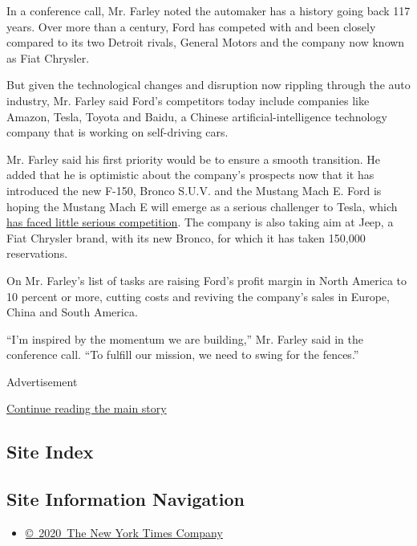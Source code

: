 In a conference call, Mr. Farley noted the automaker has a history going
back 117 years. Over more than a century, Ford has competed with and
been closely compared to its two Detroit rivals, General Motors and the
company now known as Fiat Chrysler.

But given the technological changes and disruption now rippling through
the auto industry, Mr. Farley said Ford's competitors today include
companies like Amazon, Tesla, Toyota and Baidu, a Chinese
artificial-intelligence technology company that is working on
self-driving cars.

Mr. Farley said his first priority would be to ensure a smooth
transition. He added that he is optimistic about the company's prospects
now that it has introduced the new F-150, Bronco S.U.V. and the Mustang
Mach E. Ford is hoping the Mustang Mach E will emerge as a serious
challenger to Tesla, which
\href{https://www.nytimes3xbfgragh.onion/2020/07/22/business/tesla-electric-car-audi-polestar.html}{has
faced little serious competition}. The company is also taking aim at
Jeep, a Fiat Chrysler brand, with its new Bronco, for which it has taken
150,000 reservations.

On Mr. Farley's list of tasks are raising Ford's profit margin in North
America to 10 percent or more, cutting costs and reviving the company's
sales in Europe, China and South America.

``I'm inspired by the momentum we are building,'' Mr. Farley said in the
conference call. ``To fulfill our mission, we need to swing for the
fences.''

Advertisement

\protect\hyperlink{after-bottom}{Continue reading the main story}

\hypertarget{site-index}{%
\subsection{Site Index}\label{site-index}}

\hypertarget{site-information-navigation}{%
\subsection{Site Information
Navigation}\label{site-information-navigation}}

\begin{itemize}
\tightlist
\item
  \href{https://help.nytimes3xbfgragh.onion/hc/en-us/articles/115014792127-Copyright-notice}{©~2020~The
  New York Times Company}
\end{itemize}

